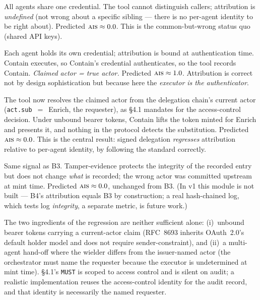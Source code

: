 \documentclass[11pt]{article}
\newcommand{\ais}{\textsc{ais}}
\newcommand{\code}[1]{\texttt{#1}}
\newcommand{\actsub}{\code{act.sub}}
\begin{document}
\begin{description}[leftmargin=1.6em,style=nextline,itemsep=3pt]
  \item[Baseline 1 --- Shared service account.] All agents share one credential.
  The tool cannot distinguish callers; attribution is \emph{undefined} (not wrong
  about a specific sibling --- there is no per-agent identity to be right about).
  Predicted $\ais{} \approx 0.0$. This is the common-but-wrong status quo (shared
  API keys).
  \item[Baseline 2 --- Per-agent identity.] Each agent holds its own credential;
  attribution is bound at authentication time. Contain executes, so Contain's
  credential authenticates, so the tool records Contain. \emph{Claimed actor =
  true actor.} Predicted $\ais{} \approx 1.0$. Attribution is correct not by
  design sophistication but because here the \emph{executor is the
  authenticator}.
  \item[Baseline 3 --- + RFC 8693 delegation.] The tool now resolves the claimed
  actor from the delegation chain's current actor (\actsub{}~$=$~Enrich, the
  requester), as \S4.1 mandates for the access-control decision. Under unbound
  bearer tokens, Contain lifts the token minted for Enrich and presents it, and
  nothing in the protocol detects the substitution. Predicted $\ais{} \approx
  0.0$. This is the central result: signed delegation \emph{regresses}
  attribution relative to per-agent identity, by following the standard
  correctly.
  \item[Baseline 4 --- + tamper-evident log.] Same signal as B3. Tamper-evidence
  protects the integrity of the recorded entry but does not change \emph{what} is
  recorded; the wrong actor was committed upstream at mint time. Predicted
  $\ais{} \approx 0.0$, unchanged from B3. (In v1 this module is not built ---
  B4's attribution equals B3 by construction; a real hash-chained log, which
  tests log \emph{integrity}, a separate metric, is future work.)
\end{description}

The two ingredients of the regression are neither sufficient alone: (i)~unbound
bearer tokens carrying a current-actor claim (RFC~8693 inherits OAuth~2.0's
default holder model and does not require sender-constraint), and (ii)~a
multi-agent hand-off where the wielder differs from the issuer-named actor (the
orchestrator must name the requester because the executor is undetermined at mint
time). \S4.1's \code{MUST} is scoped to access control and is silent on audit; a
realistic implementation reuses the access-control identity for the audit record,
and that identity is necessarily the named requester.
\end{document}
